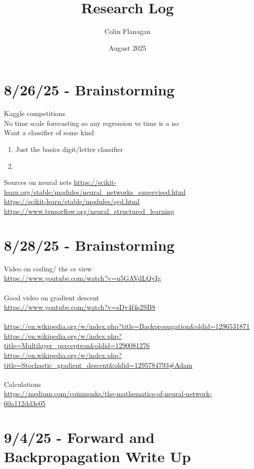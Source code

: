 \documentclass[]{article}
\title{Research Log}
\author{Colin Flanagan}
\date{August 2025}
\begin{document}
\maketitle

\section{8/26/25 - Brainstorming}
Kaggle competitions\\
No time scale forecasting so any regression vs time is a no\\
Want a classifier of some kind
\begin{enumerate}
    \item Just the basics digit/letter classifier\\
    \item 
\end{enumerate}
Sources on neural nets
\url{https://scikit-learn.org/stable/modules/neural_networks_supervised.html}\\
\url{https://scikit-learn/stable/modules/sgd.html}\\
\url{https://www.tensorflow.org/neural_structured_learning}

\section{8/28/25 - Brainstorming}
Video on coding/ the cs view\\
\url{https://www.youtube.com/watch?v=u5GAVdLQyIg}\\
\\
Good video on gradient descent\\
\url{https://www.youtube.com/watch?v=sDv4f4s2SB8}\\
\\
\url{https://en.wikipedia.org/w/index.php?title=Backpropagation&oldid=1296531871}\\
\url{https://en.wikipedia.org/w/index.php?title=Multilayer_perceptron&oldid=1290081276}\\
\url{https://en.wikipedia.org/w/index.php?title=Stochastic_gradient_descent&oldid=1295784793#Adam}\\
\\
Calculations\\
\url{https://medium.com/coinmonks/the-mathematics-of-neural-network-60a112dd3e05}\\

\section{9/4/25 - Forward and Backpropagation Write Up}
\end{document}

